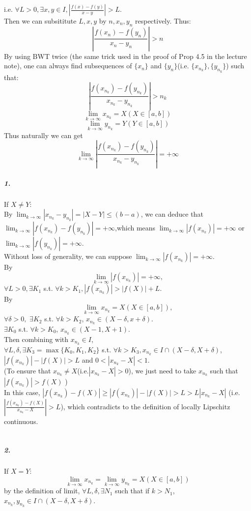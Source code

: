 \documentclass{article}
\def\to{\rightarrow}
\begin{document}
i.e. $\forall L>0,\exists x,y\in I,
 \left|\frac{f(x)-f(y)}{x-y}\right|> L$.\\
 Then we can subsititute $L,x,y$ by $n,x_n,y_n$ respectively.
 Thus:
 $$\left|\frac{f(x_n)-f(y_n)}{x_n-y_n}\right|> n$$
 By using BWT twice (the same trick used in the proof of Prop 4.5 in the lecture note), one can always find subsequences of $\{x_n\}$
 and $\{y_n\}$(i.e. $\{x_{n_k}\},\{y_{n_k}\}$) such that:
 $$\left|\frac{f(x_{n_k})-f(y_{n_k})}{x_{n_k}-y_{n_k}}\right|> {n_k}$$
 $$\lim_{k\to\infty}x_{n_k}=X(X\in [a,b])$$
 $$\lim_{k\to\infty}y_{n_k}=Y(Y\in [a,b])$$
 Thus naturally we can get\
 $$\lim_{k\to\infty} \left|\frac{f(x_{n_k})-f(y_{n_k})}
 {x_{n_k}-y_{n_k}}\right|=
 +\infty$$
 \subparagraph{1.}
 If $X\neq Y$:
 \\
 By $ \lim_{k\to\infty}|x_{n_k}-y_{n_k}|=|X-Y|\leq (b-a)$, we can deduce that
 $\lim_{k\to\infty}|f(x_{n_k})-f(y_{n_k})|=+\infty$,which means 
 $\lim_{k\to\infty}|f(x_{n_k})|=+\infty$ or  $\lim_{k\to\infty}|f(y_{n_k})|=+\infty$.\\
 Without loss of generality, we can suppose
 $\lim_{k\to\infty}|f(x_{n_k})|=+\infty.$\\
 By  $$\lim_{k\to\infty}|f(x_{n_k})|=+\infty,$$ 
 $\forall L>0,\exists K_1$ s.t. $\forall k>K_1, |f(x_{n_k})|>|f(X)|+L.$\\
 By  $$\lim_{k\to\infty}x_{n_k}=X(X\in [a,b]),$$
 $\forall \delta>0,$ $\exists K_2$ s.t. $\forall k>K_2$, $x_{n_k}\in(X-\delta,x+\delta).$\\
 $\exists K_0$ s.t. $\forall k>K_0$, $x_{n_k}\in(X-1,X+1).$\\
 Then combining with $x_{n_k}\in I$, \\ $\forall L,\delta ,
 \exists K_3=\max \{K_0,K_1,K_2\}$ s.t. $\forall k>K_3,  x_{n_k}\in
  I\cap (X-\delta ,X+\delta )$,
  $|f(x_{n_k})|-|f(X)|>L$ and $0<|x_{n_k}-X|<1$.\\(To ensure that $x_{n_k}\neq X$(i.e.$|x_{n_k}-X|>0$), we just need to take
  $x_{n_k}$ such that $|f(x_{n_k})|>f(X)$ )\\
  In this case, $ |f(x_{n_k})-f(X)|\geq|f(x_{n_k})|-|f(X)|>L> L|x_{n_k} − X|$
  (i.e.$\left|\frac{f(x_{n_k})-f(X)}{x_{n_k}-X}\right|>L$),
  which 
  contradicts to the definition of locally Lipschitz continuous.\\ \ \\
  \subparagraph{2.}
  If $X=Y$:
  $$\lim_{k\to\infty}x_{n_k}=
  \lim_{k\to\infty}y_{n_k}=X(X\in [a,b])$$
  by the definition of limit, 
  $\forall L,\delta,\exists N_1$ such that if $k>N_1$, $ x_{n_k},y_{n_k}\in I\cap (X-\delta,X+\delta)$.
  
\end{document}
